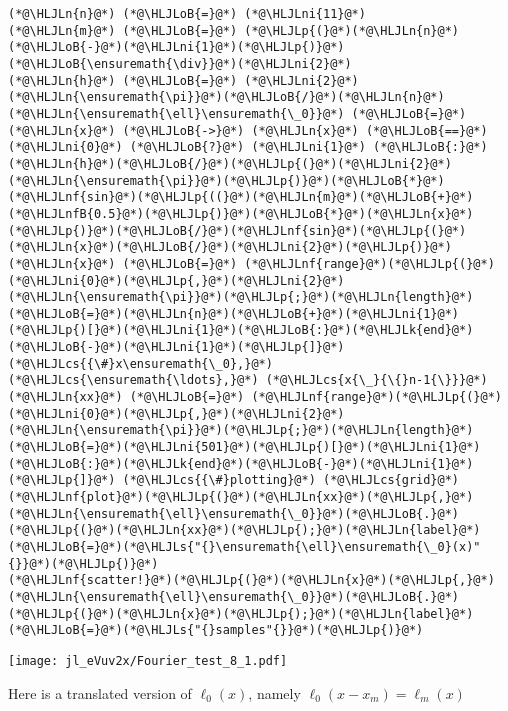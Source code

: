 \documentclass[12pt,a4paper]{article}
\newcommand{\HLJLk}[1]{\textcolor[RGB]{148,91,176}{\textbf{#1}}}
\newcommand{\HLJLn}[1]{#1}
\newcommand{\HLJLnf}[1]{\textcolor[RGB]{66,102,213}{#1}}
\newcommand{\HLJLs}[1]{\textcolor[RGB]{201,61,57}{#1}}
\newcommand{\HLJLnfB}[1]{\textcolor[RGB]{59,151,46}{#1}}
\newcommand{\HLJLni}[1]{\textcolor[RGB]{59,151,46}{#1}}
\newcommand{\HLJLoB}[1]{\textcolor[RGB]{102,102,102}{\textbf{#1}}}
\newcommand{\HLJLp}[1]{#1}
\newcommand{\HLJLcs}[1]{\textcolor[RGB]{153,153,119}{\textit{#1}}}
\begin{document}
\begin{lstlisting}
(*@\HLJLn{n}@*) (*@\HLJLoB{=}@*) (*@\HLJLni{11}@*)
(*@\HLJLn{m}@*) (*@\HLJLoB{=}@*) (*@\HLJLp{(}@*)(*@\HLJLn{n}@*)(*@\HLJLoB{-}@*)(*@\HLJLni{1}@*)(*@\HLJLp{)}@*)(*@\HLJLoB{\ensuremath{\div}}@*)(*@\HLJLni{2}@*)
(*@\HLJLn{h}@*) (*@\HLJLoB{=}@*) (*@\HLJLni{2}@*)(*@\HLJLn{\ensuremath{\pi}}@*)(*@\HLJLoB{/}@*)(*@\HLJLn{n}@*)
(*@\HLJLn{\ensuremath{\ell}\ensuremath{\_0}}@*) (*@\HLJLoB{=}@*) (*@\HLJLn{x}@*) (*@\HLJLoB{->}@*) (*@\HLJLn{x}@*) (*@\HLJLoB{==}@*) (*@\HLJLni{0}@*) (*@\HLJLoB{?}@*) (*@\HLJLni{1}@*) (*@\HLJLoB{:}@*) (*@\HLJLn{h}@*)(*@\HLJLoB{/}@*)(*@\HLJLp{(}@*)(*@\HLJLni{2}@*)(*@\HLJLn{\ensuremath{\pi}}@*)(*@\HLJLp{)}@*)(*@\HLJLoB{*}@*)(*@\HLJLnf{sin}@*)(*@\HLJLp{((}@*)(*@\HLJLn{m}@*)(*@\HLJLoB{+}@*)(*@\HLJLnfB{0.5}@*)(*@\HLJLp{)}@*)(*@\HLJLoB{*}@*)(*@\HLJLn{x}@*)(*@\HLJLp{)}@*)(*@\HLJLoB{/}@*)(*@\HLJLnf{sin}@*)(*@\HLJLp{(}@*)(*@\HLJLn{x}@*)(*@\HLJLoB{/}@*)(*@\HLJLni{2}@*)(*@\HLJLp{)}@*)
(*@\HLJLn{x}@*) (*@\HLJLoB{=}@*) (*@\HLJLnf{range}@*)(*@\HLJLp{(}@*)(*@\HLJLni{0}@*)(*@\HLJLp{,}@*)(*@\HLJLni{2}@*)(*@\HLJLn{\ensuremath{\pi}}@*)(*@\HLJLp{;}@*)(*@\HLJLn{length}@*)(*@\HLJLoB{=}@*)(*@\HLJLn{n}@*)(*@\HLJLoB{+}@*)(*@\HLJLni{1}@*)(*@\HLJLp{)[}@*)(*@\HLJLni{1}@*)(*@\HLJLoB{:}@*)(*@\HLJLk{end}@*)(*@\HLJLoB{-}@*)(*@\HLJLni{1}@*)(*@\HLJLp{]}@*) (*@\HLJLcs{{\#}x\ensuremath{\_0},}@*) (*@\HLJLcs{\ensuremath{\ldots},}@*) (*@\HLJLcs{x{\_}{\{}n-1{\}}}@*)
(*@\HLJLn{xx}@*) (*@\HLJLoB{=}@*) (*@\HLJLnf{range}@*)(*@\HLJLp{(}@*)(*@\HLJLni{0}@*)(*@\HLJLp{,}@*)(*@\HLJLni{2}@*)(*@\HLJLn{\ensuremath{\pi}}@*)(*@\HLJLp{;}@*)(*@\HLJLn{length}@*)(*@\HLJLoB{=}@*)(*@\HLJLni{501}@*)(*@\HLJLp{)[}@*)(*@\HLJLni{1}@*)(*@\HLJLoB{:}@*)(*@\HLJLk{end}@*)(*@\HLJLoB{-}@*)(*@\HLJLni{1}@*)(*@\HLJLp{]}@*) (*@\HLJLcs{{\#}plotting}@*) (*@\HLJLcs{grid}@*)
(*@\HLJLnf{plot}@*)(*@\HLJLp{(}@*)(*@\HLJLn{xx}@*)(*@\HLJLp{,}@*)(*@\HLJLn{\ensuremath{\ell}\ensuremath{\_0}}@*)(*@\HLJLoB{.}@*)(*@\HLJLp{(}@*)(*@\HLJLn{xx}@*)(*@\HLJLp{);}@*)(*@\HLJLn{label}@*)(*@\HLJLoB{=}@*)(*@\HLJLs{"{}\ensuremath{\ell}\ensuremath{\_0}(x)"{}}@*)(*@\HLJLp{)}@*)
(*@\HLJLnf{scatter!}@*)(*@\HLJLp{(}@*)(*@\HLJLn{x}@*)(*@\HLJLp{,}@*)(*@\HLJLn{\ensuremath{\ell}\ensuremath{\_0}}@*)(*@\HLJLoB{.}@*)(*@\HLJLp{(}@*)(*@\HLJLn{x}@*)(*@\HLJLp{);}@*)(*@\HLJLn{label}@*)(*@\HLJLoB{=}@*)(*@\HLJLs{"{}samples"{}}@*)(*@\HLJLp{)}@*)
\end{lstlisting}

\texttt{[image: jl\_eVuv2x/Fourier\_test\_8\_1.pdf]}

Here is a translated version of $\ell_0(x)$, namely $\ell_0(x-x_{m}) = \ell_{m}(x)$
\end{document}
